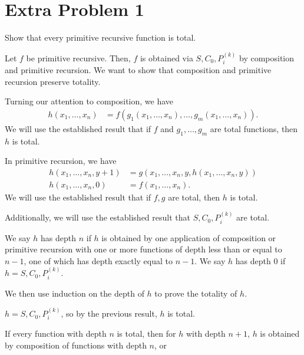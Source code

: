 \documentclass[10pt]{mypackage}
\begin{document}
\section{Extra Problem 1}%
\begin{problem}
  Show that every primitive recursive function is total.
\end{problem}
\begin{solution}[Proof 1]
  Let $f$ be primitive recursive. Then, $f$ is obtained via $S,C_0,P_{i}^{(k)}$ by composition and primitive recursion. We want to show that composition and primitive recursion preserve totality.\newline

  Turning our attention to composition, we have
  \begin{align*}
    h\left(x_1,\dots,x_n\right) &= f\left(g_1\left(x_1,\dots,x_n\right),\dots,g_m\left(x_1,\dots,x_n\right)\right).
  \end{align*}
  We will use the established result that if $f$ and $g_1,\dots,g_m$ are total functions, then $h$ is total.\newline

  In primitive recursion, we have
  \begin{align*}
    h\left(x_1,\dots,x_n,y+1\right) &= g\left(x_1,\dots,x_n,y,h\left(x_1,\dots,x_n,y\right)\right)\\
    h\left(x_1,\dots,x_n,0\right) &= f\left(x_1,\dots,x_n\right).
  \end{align*}
  We will use the established result that if $f,g$ are total, then $h$ is total.\newline

  Additionally, we will use the established result that $S,C_0,P_{i}^{(k)}$ are total.\newline

  We say $h$ has depth $n$ if $h$ is obtained by one application of composition or primitive recursion with one or more functions of depth less than or equal to $n-1$, one of which has depth exactly equal to $n-1$. We say $h$ has depth $0$ if $h = S,C_0,P_{i}^{(k)}$.\newline

  We then use induction on the depth of $h$ to prove the totality of $h$.
  \begin{description}[font=\normalfont]
    \item[$d = 0$:] $h = S,C_0,P_{i}^{(k)}$, so by the previous result, $h$ is total.
    \item[$d = n+1$:] If every function with depth $n$ is total, then for $h$ with depth $n+1$, $h$ is obtained by composition of functions with depth $n$, or 
  \end{description}
\end{solution}
\end{document}
